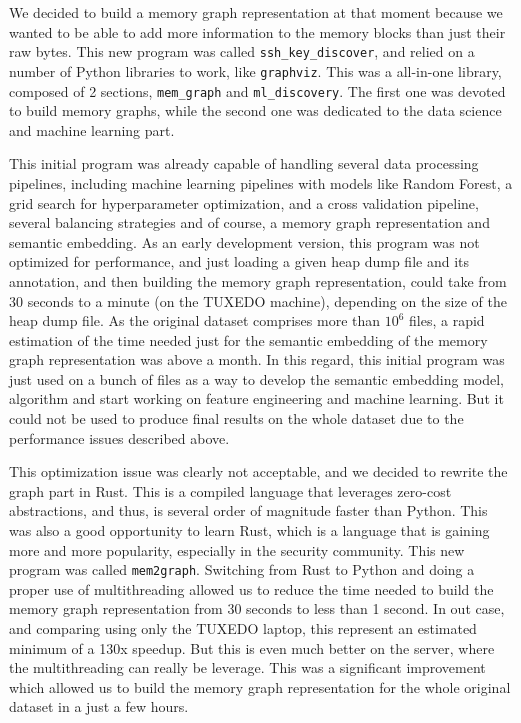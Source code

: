 We decided to build a memory graph representation at that moment because we wanted to be able to add more information to the memory blocks than just their raw bytes. This new program was called \texttt{ssh\_key\_discover}, and relied on a number of Python libraries to work, like \texttt{graphviz}. This was a all-in-one library, composed of 2 sections, \texttt{mem\_graph} and \texttt{ml\_discovery}. The first one was devoted to build memory graphs, while the second one was dedicated to the data science and machine learning part.

This initial program was already capable of handling several data processing pipelines, including machine learning pipelines with models like Random Forest, a grid search for hyperparameter optimization, and a cross validation pipeline, several balancing strategies and of course, a memory graph representation and semantic embedding. As an early development version, this program was not optimized for performance, and just loading a given heap dump file and its annotation, and then building the memory graph representation, could take from 30 seconds to a minute (on the TUXEDO machine), depending on the size of the heap dump file. As the original dataset comprises more than $ 10^{6} $ files, a rapid estimation of the time needed just for the semantic embedding of the memory graph representation was above a month. In this regard, this initial program was just used on a bunch of files as a way to develop the semantic embedding model, algorithm and start working on feature engineering and machine learning. But it could not be used to produce final results on the whole dataset due to the performance issues described above.

This optimization issue was clearly not acceptable, and we decided to rewrite the graph part in Rust. This is a compiled language that leverages zero-cost abstractions, and thus, is several order of magnitude faster than Python. This was also a good opportunity to learn Rust, which is a language that is gaining more and more popularity, especially in the security community. This new program was called \texttt{mem2graph}. Switching from Rust to Python and doing a proper use of multithreading allowed us to reduce the time needed to build the memory graph representation from 30 seconds to less than 1 second. In out case, and comparing using only the TUXEDO laptop, this represent an estimated minimum of a 130x speedup. But this is even much better on the server, where the multithreading can really be leverage. This was a significant improvement which allowed us to build the memory graph representation for the whole original dataset in a just a few hours.

